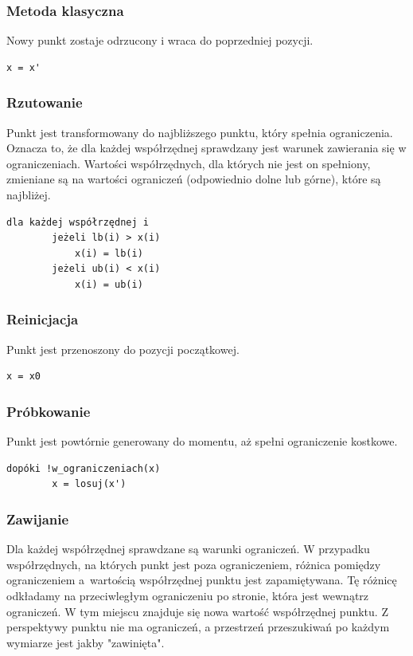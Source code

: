 \documentclass{mini}
\begin{document}
\subsubsection{Metoda klasyczna}
Nowy punkt zostaje odrzucony i wraca do poprzedniej pozycji.

\begin{Verbatim}[baselinestretch=1.1]
	x = x'
\end{Verbatim}


\subsubsection{Rzutowanie}
\label{secrzut}
Punkt jest transformowany do najbliższego punktu, który spełnia ograniczenia. Oznacza to, że dla każdej współrzędnej sprawdzany jest warunek zawierania się w ograniczeniach. Wartości współrzędnych, dla których nie jest on spełniony, zmieniane są na wartości ograniczeń (odpowiednio dolne lub górne), które są najbliżej.

\begin{Verbatim}[baselinestretch=1.1]
	dla każdej współrzędnej i
		jeżeli lb(i) > x(i)
			x(i) = lb(i)
		jeżeli ub(i) < x(i)
			x(i) = ub(i)
\end{Verbatim}

\subsubsection{Reinicjacja} \label{reinicjacja}
Punkt jest przenoszony do pozycji początkowej.

\begin{Verbatim}[baselinestretch=1.1]
	x = x0
\end{Verbatim}

\subsubsection{Próbkowanie}
Punkt jest powtórnie generowany do momentu, aż spełni ograniczenie kostkowe.

\begin{Verbatim}[baselinestretch=1.1]
	dopóki !w_ograniczeniach(x)
		x = losuj(x')
\end{Verbatim}

\subsubsection{Zawijanie}
Dla każdej współrzędnej sprawdzane są warunki ograniczeń. W przypadku współrzędnych, na których punkt jest poza ograniczeniem, różnica pomiędzy ograniczeniem a~wartością współrzędnej punktu jest zapamiętywana. Tę różnicę odkładamy na przeciwległym ograniczeniu po stronie, która jest wewnątrz ograniczeń. W tym miejscu znajduje się nowa wartość współrzędnej punktu. Z perspektywy punktu nie ma ograniczeń, a przestrzeń przeszukiwań po każdym wymiarze jest jakby "zawinięta".
\end{document}
